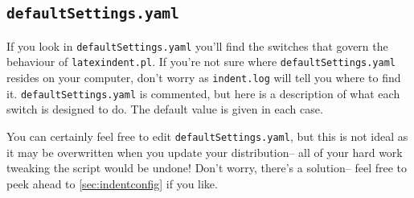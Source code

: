 \subsection{\lstinline!defaultSettings.yaml!}
If you look in \lstinline!defaultSettings.yaml! you'll find the switches 
that govern the behaviour of \lstinline!latexindent.pl!. If you're not sure where
\lstinline!defaultSettings.yaml! resides on your computer, don't worry as \lstinline!indent.log!
will tell you where to find it.
\lstinline!defaultSettings.yaml! is commented, 
but here is a description of what each switch is designed to do. The default 
value is given in each case.
 	 	 	 	 	
You can certainly feel free to edit \lstinline!defaultSettings.yaml!, but 
this is not ideal as it may be overwritten when you update your distribution--
all of your hard work tweaking the script would be undone! Don't worry, 
there's a solution-- feel free to peek ahead to \cref{sec:indentconfig} if you like.
